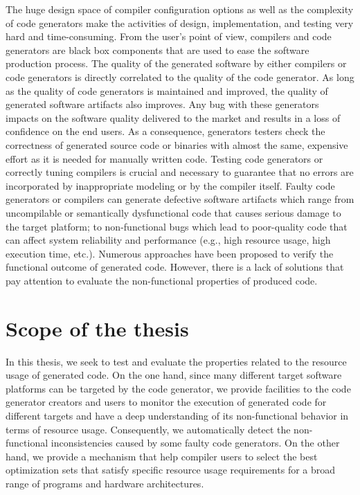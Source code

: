  



 

 


The huge design space of compiler configuration options as well as the complexity of code generators make the activities of design, implementation, and testing very hard and time-consuming\cite{guana2015developers}.
From the user's point of view, compilers and code generators are black box components that are used to ease the software production process. The quality of the generated software by either compilers or code generators is directly correlated to the quality of the code generator. As long as the quality of code generators is maintained and improved, the quality of generated software artifacts also improves. Any bug with these generators impacts on the software quality delivered to the market and results in a loss of confidence on the end users.
As a consequence, generators testers check the correctness of generated source code or binaries with almost the same, expensive effort as it is needed for manually written code. 
Testing code generators or correctly tuning compilers is crucial and necessary to guarantee that no errors are incorporated by inappropriate modeling or by the compiler itself.
Faulty code generators or compilers can generate defective software artifacts which range from uncompilable or semantically dysfunctional code that causes serious damage to the target platform; to non-functional bugs which lead to poor-quality code that can affect system reliability and performance (e.g., high resource usage, high execution time, etc.). 
Numerous approaches have been proposed\cite{stuermer2007systematic,yang2011finding} to verify the functional outcome of generated code. However, there is a lack of solutions that pay attention to evaluate the non-functional properties of produced code.


\section{Scope of the thesis}

In this thesis, we seek to test and evaluate the properties related to the resource usage of generated code. 
On the one hand, since many different target software platforms can be targeted by the code generator, we provide facilities to the code generator creators and users to monitor the execution of generated code for different targets and have a deep understanding of its non-functional behavior in terms of resource usage. Consequently, we automatically detect the non-functional inconsistencies caused by some faulty code generators. 
On the other hand, we provide a mechanism that help compiler users to select the best optimization sets that satisfy specific resource usage requirements for a broad range of programs and hardware architectures.

